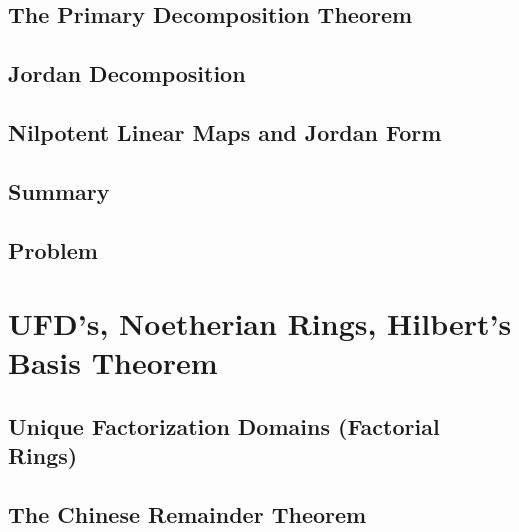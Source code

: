 \documentclass[a4paper]{article}
\begin{document}
\subsection{ The Primary Decomposition Theorem} %

\subsection{ Jordan Decomposition} %

\subsection{ Nilpotent Linear Maps and Jordan Form} %

\subsection{ Summary} %

\subsection{ Problem} %


\newpage
\section{UFD’s, Noetherian Rings, Hilbert’s Basis Theorem}
\subsection{ Unique Factorization Domains (Factorial Rings)} %

\subsection{ The Chinese Remainder Theorem} %
\end{document}
